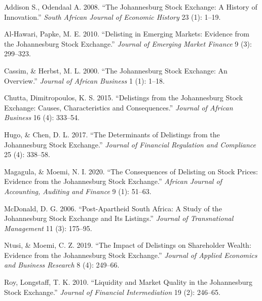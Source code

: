 \documentclass[
]{article}
\newlength{\cslhangindent}
\newlength{\cslentryspacingunit} %
\newenvironment{CSLReferences}[2] %
 {%
  \setlength{\parindent}{0pt}
  \ifodd #1
  \let\oldpar\par
  \def\par{\hangindent=\cslhangindent\oldpar}
  \fi
  \setlength{\parskip}{#2\cslentryspacingunit}
 }%
 {}
\begin{document}
\hypertarget{refs}{}
\begin{CSLReferences}{1}{0}
\leavevmode{}%
Addison S., Odendaal A. 2008. {``The Johannesburg Stock Exchange: A
History of Innovation.''} \emph{South African Journal of Economic
History} 23 (1): 1--19.

\leavevmode{}%
Al-Hawari, Papke, M. E. 2010. {``Delisting in Emerging Markets: Evidence
from the Johannesburg Stock Exchange.''} \emph{Journal of Emerging
Market Finance} 9 (3): 299--323.

\leavevmode{}%
Cassim, \& Herbst, M. L. 2000. {``The Johannesburg Stock Exchange: An
Overview.''} \emph{Journal of African Business} 1 (1): 1--18.

\leavevmode{}%
Chutta, Dimitropoulos, K. S. 2015. {``Delistings from the Johannesburg
Stock Exchange: Causes, Characteristics and Consequences.''}
\emph{Journal of African Business} 16 (4): 333--54.

\leavevmode{}%
Hugo, \& Chen, D. L. 2017. {``The Determinants of Delistings from the
Johannesburg Stock Exchange.''} \emph{Journal of Financial Regulation
and Compliance} 25 (4): 338--58.

\leavevmode{}%
Magagula, \& Moemi, N. I. 2020. {``The Consequences of Delisting on
Stock Prices: Evidence from the Johannesburg Stock Exchange.''}
\emph{African Journal of Accounting, Auditing and Finance} 9 (1):
51--63.

\leavevmode{}%
McDonald, D. G. 2006. {``Post-Apartheid South Africa: A Study of the
Johannesburg Stock Exchange and Its Listings.''} \emph{Journal of
Transnational Management} 11 (3): 175--95.

\leavevmode{}%
Ntusi, \& Moemi, C. Z. 2019. {``The Impact of Delistings on Shareholder
Wealth: Evidence from the Johannesburg Stock Exchange.''} \emph{Journal
of Applied Economics and Business Research} 8 (4): 249--66.

\leavevmode{}%
Roy, Longstaff, T. K. 2010. {``Liquidity and Market Quality in the
Johannesburg Stock Exchange.''} \emph{Journal of Financial
Intermediation} 19 (2): 246--65.

\end{CSLReferences}
\end{document}
